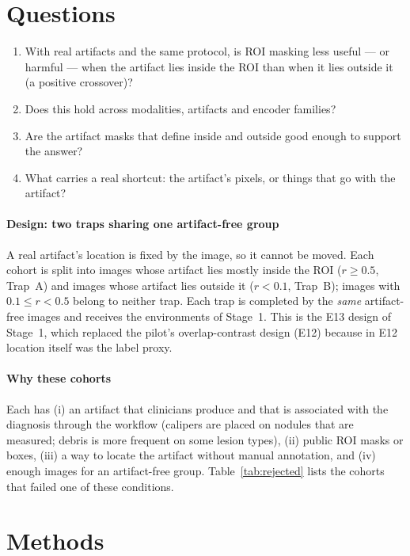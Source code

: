 \section{Questions}
\begin{enumerate}[label=\textbf{Q3\alph*},leftmargin=*]\itemsep1pt
\item With real artifacts and the same protocol, is ROI masking less useful --- or harmful --- when the artifact lies
inside the ROI than when it lies outside it (a positive crossover)?
\item Does this hold across modalities, artifacts and encoder families?
\item Are the artifact masks that define inside and outside good enough to support the answer?
\item What carries a real shortcut: the artifact's pixels, or things that go with the artifact?
\end{enumerate}
\paragraph{Design: two traps sharing one artifact-free group} A real artifact's location is fixed by the image, so it
cannot be moved. Each cohort is split into images whose artifact lies mostly inside the ROI ($r\ge0.5$, Trap~A) and
images whose artifact lies outside it ($r<0.1$, Trap~B); images with $0.1\le r<0.5$ belong to neither trap. Each trap is
completed by the \emph{same} artifact-free images and receives the environments of Stage~1. This is the E13 design of
Stage~1, which replaced the pilot's overlap-contrast design (E12) because in E12 location itself was the label proxy.
\paragraph{Why these cohorts} Each has (i) an artifact that clinicians produce and that is associated with the
diagnosis through the workflow (calipers are placed on nodules that are measured; debris is more frequent on some lesion
types), (ii) public ROI masks or boxes, (iii) a way to locate the artifact without manual annotation, and (iv) enough
images for an artifact-free group. Table~\ref{tab:rejected} lists the cohorts that failed one of these conditions.

\section{Methods}
